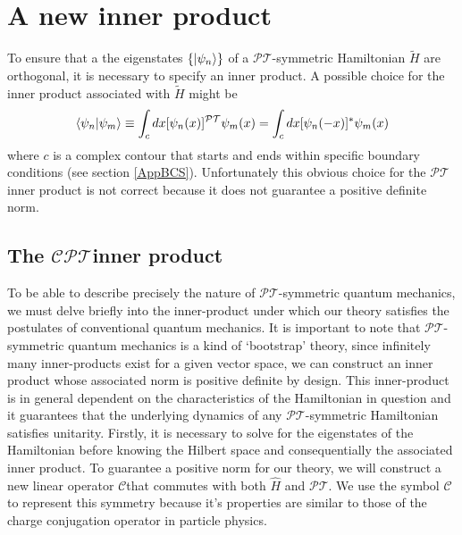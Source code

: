 \documentclass[12pt, a4paper]{report}
\newcommand\PT{\(\mathcal{PT}\)}
\newcommand\CC{\(\mathcal{C}\)}
\begin{document}
\section{A new inner product}\label{PTinnerp}
To ensure that a the eigenstates $\{\ket{\psi_n}\}$ of a \PT-symmetric Hamiltonian $\tilde{H}$ are orthogonal, it is necessary to specify an inner product. A possible choice for the inner product associated with $\tilde{H}$ might be\cite{PTsymmetricQM}
\begin{equation}\label{eq:1.3}
\braket{\psi_n|\psi_m} \equiv \int_{c} dx [\psi_{n}(x)]^{\mathcal{PT}}\psi_m(x) = \int_{c} dx [\psi_{n}(-x)]^{*}\psi_m(x)
\end{equation}
where $c$ is a complex contour that starts and ends within specific boundary conditions (see section \ref{AppBCS}). Unfortunately this obvious choice for the \PT\:inner product is not correct because it does not guarantee a positive definite norm.

\subsection{The \texorpdfstring{$\mathcal{CPT}$}\:\:inner product}\label{CPT}
To be able to describe precisely the nature of \PT-symmetric quantum mechanics, we must delve briefly into the inner-product under which our theory satisfies the postulates of conventional quantum mechanics. It is important to note that \PT-symmetric quantum mechanics is a kind of `bootstrap' theory\cite{MakingSense}, since infinitely many inner-products exist for a given vector space, we can construct an inner product whose associated norm is positive definite by design. This inner-product is in general dependent on the characteristics of the Hamiltonian in question and it guarantees that the underlying dynamics of any \PT-symmetric Hamiltonian satisfies unitarity\cite{MustaHbeHermitian}.
Firstly, it is necessary to solve for the eigenstates of the Hamiltonian before knowing the Hilbert space and consequentially the associated inner product.
To guarantee a positive norm for our theory, we will construct a new linear operator \CC\:that commutes with both $\hat{H}$ and \PT. We use the symbol \CC\: to represent this symmetry because it's properties are similar to those of the charge conjugation operator in particle physics\cite{MakingSense}.

\end{document}
